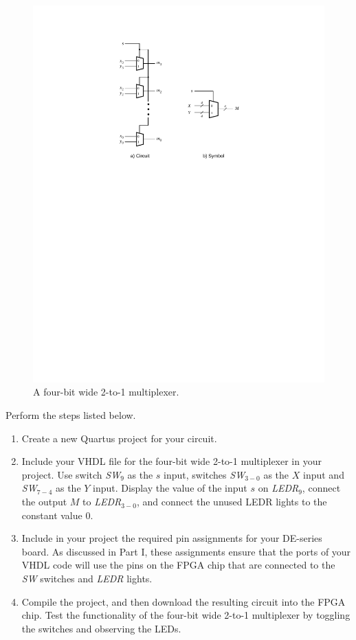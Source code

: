 \documentclass[epsfig,10pt,fullpage]{article}
\begin{document}
\begin{figure}[htb]
	\begin{center}
		\includegraphics[scale=.8]{figures/figure3.pdf}
	\end{center}
\caption{A four-bit wide 2-to-1 multiplexer.}
\label{fig:3}
\end{figure}

Perform the steps listed below.
\begin{enumerate}
\item Create a new Quartus  project for your circuit.
\item Include your VHDL file for the four-bit wide 2-to-1 multiplexer 
in your project. Use switch {\it SW}$_{9}$ as the $s$ input, switches
{\it SW}$_{3-0}$ as the $X$ input and 
{\it SW}$_{7-4}$ as the $Y$ input. Display the value of the input $s$ on {\it LEDR}$_9$,
connect the output $M$ to {\it LEDR}$_{3-0}$, and connect the unused LEDR lights to the constant value 0.
\item Include in your project the required pin assignments for your DE-series board. As discussed
in Part I, these assignments ensure that the ports of your VHDL code will use the pins 
on the FPGA chip that are connected to the {\it SW} switches and {\it LEDR} lights. 
\item Compile the project, and then download the resulting circuit into the FPGA chip. 
Test the functionality of the 
four-bit wide 2-to-1 multiplexer by toggling the switches and observing the LEDs.
\end{enumerate}
\end{document}
